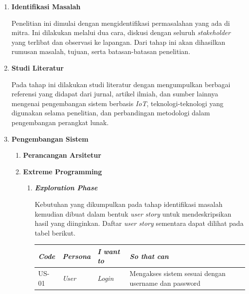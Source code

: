 \begin{enumerate}
    \item \textbf{Identifikasi Masalah}
    
    Penelitian ini dimulai dengan mengidentifikasi permasalahan yang ada di mitra. Ini dilakukan melalui dua cara, diskusi dengan seluruh \textit{stakeholder} yang terlibat dan observasi ke lapangan. Dari tahap ini akan dihasilkan rumusan masalah, tujuan, serta batasan-batasan penelitian.

    \item \textbf{Studi Literatur}
    
    Pada tahap ini dilakukan studi literatur dengan mengumpulkan berbagai referensi yang didapat dari jurnal, artikel ilmiah, dan sumber lainnya mengenai pengembangan sistem berbasis \textit{IoT}, teknologi-teknologi yang digunakan selama penelitian, dan perbandingan metodologi dalam pengembangan perangkat lunak.

    \item \textbf{Pengembangan Sistem}
    
    \begin{enumerate}[label*=\arabic*.]
        \item \textbf{Perancangan Arsitetur}
        \item \textbf{Extreme Programming}
        
        \begin{enumerate}[label*=\arabic*.]
            \item \textbf{\textit{Exploration Phase}}
            
            Kebutuhan yang dikumpulkan pada tahap identifikasi masalah kemudian dibuat dalam bentuk \textit{user story} untuk mendeskripsikan hasil yang diinginkan. Daftar \textit{user story} sementara dapat dilihat pada tabel berikut.

            \begin{longtable}[!h]
                {
                    p{}
                    p{}
                    p{}
                    p{}
                }
                    \toprule
                    \textit{Code} & 
                    \textit{Persona} & 
                    \textit{I want to} &
                    \textit{So that can} \\ [0.5ex] 
                    \midrule
                    
                    US-01 & 
                    \textit{User} & 
                    \textit{Login} & 
                    Mengakses sistem sesuai dengan username dan password 
                    \\  
                    

\end{longtable}
\end{enumerate}
\end{enumerate}
\end{enumerate}
